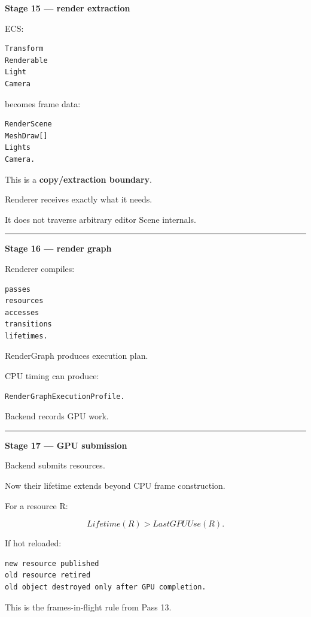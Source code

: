 \textbf{Stage 15 --- render extraction}

ECS:

\begin{verbatim}
Transform
Renderable
Light
Camera
\end{verbatim}

becomes frame data:

\begin{verbatim}
RenderScene
MeshDraw[]
Lights
Camera.
\end{verbatim}

This is a \textbf{copy/extraction boundary}.

Renderer receives exactly what it needs.

It does not traverse arbitrary editor Scene internals.

\begin{center}\rule{0.5\linewidth}{0.5pt}\end{center}

\textbf{Stage 16 --- render graph}

Renderer compiles:

\begin{verbatim}
passes
resources
accesses
transitions
lifetimes.
\end{verbatim}

RenderGraph produces execution plan.

CPU timing can produce:

\begin{verbatim}
RenderGraphExecutionProfile.
\end{verbatim}

Backend records GPU work.

\begin{center}\rule{0.5\linewidth}{0.5pt}\end{center}

\textbf{Stage 17 --- GPU submission}

Backend submits resources.

Now their lifetime extends beyond CPU frame construction.

For a resource R:

\[
Lifetime(R)
>
LastGPUUse(R).
\]

If hot reloaded:

\begin{verbatim}
new resource published
old resource retired
old object destroyed only after GPU completion.
\end{verbatim}

This is the frames-in-flight rule from Pass 13.

